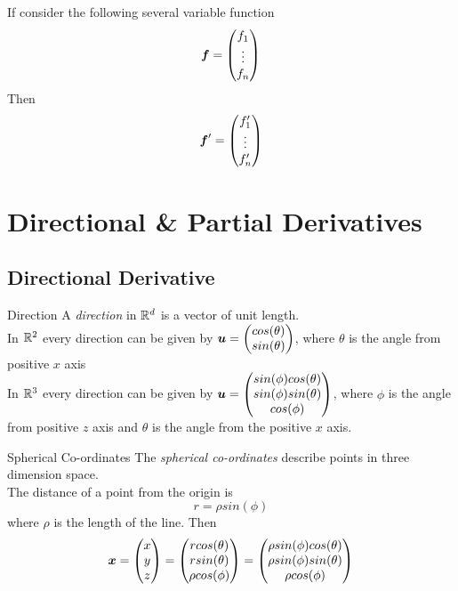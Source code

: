 \documentclass[11pt,a4paper]{article}
\begin{document}
\subtitle{Remark 9.07}{}
If consider the following several variable function
$$\boldsymbol{f} = \begin{pmatrix} f_1 \\ \vdots \\ f_n \end{pmatrix}$$
Then
$$\boldsymbol{f}' = \begin{pmatrix} f'_1 \\ \vdots \\ f'_n \end{pmatrix}$$

\section{Directional \& Partial Derivatives}

\subsection{Directional Derivative}

\subtitle{Definition 10.01 - }{Direction}
A \textit{direction} in $\mathbb{R}^d$ is a vector of unit length. \\
In $\mathbb{R}^2$ every direction can be given by $\boldsymbol{u} = \begin{pmatrix}cos(\theta)\\ sin(\theta)\end{pmatrix}$, where $\theta$ is the angle from positive $x$ axis \\
In $\mathbb{R}^3$ every direction can be given by $\boldsymbol{u} = \begin{pmatrix}sin(\phi)cos(\theta)\\ sin(\phi)sin(\theta)\\ cos(\phi)\end{pmatrix}$, where $\phi$ is the angle from positive $z$ axis and $\theta$ is the angle from the positive $x$ axis.\\

\subtitle{Definition 10.02 - }{Spherical Co-ordinates}
The \textit{spherical co-ordinates} describe points in three dimension space.\\
The distance of a point from the origin is
$$r = \rho sin(\phi)$$
where $\rho$ is the length of the line. Then
$$\boldsymbol{x} = \begin{pmatrix} x \\ y \\ z \end{pmatrix} = \begin{pmatrix} r cos(\theta) \\ r sin(\theta) \\ \rho cos(\phi) \end{pmatrix} = \begin{pmatrix} \rho sin(\phi)cos(\theta) \\ \rho sin(\phi)sin(\theta) \\ \rho cos(\phi) \end{pmatrix}$$
\end{document}
